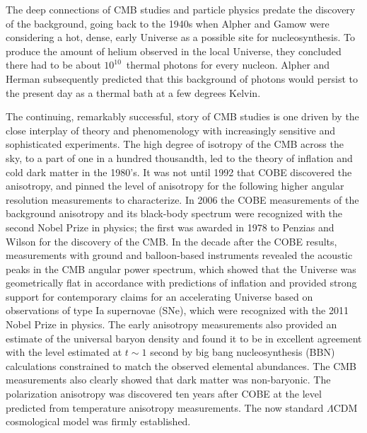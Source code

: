 The deep connections of CMB studies and particle physics predate the discovery of the background, going back to the 1940s when Alpher and Gamow were considering a hot, dense, early Universe as a possible site for nucleosynthesis. To produce the
amount of helium observed in the local Universe, they concluded there
had to be about $10^{10}$\ thermal photons for every nucleon. Alpher and Herman subsequently predicted that this background of photons would persist to the present day as a thermal bath at a few degrees Kelvin.

The continuing, remarkably successful, story of CMB studies is one driven by the close interplay of theory and phenomenology with increasingly sensitive and sophisticated experiments. The high degree of isotropy of the CMB across the sky, to a part of one in a hundred thousandth, led to the theory of inflation and cold dark matter in the 1980's. It was not until 1992 that COBE discovered the anisotropy, and pinned the level of anisotropy for the following higher angular resolution measurements to characterize. In 2006 the COBE measurements of the background anisotropy and its black-body spectrum were recognized with the second Nobel Prize in physics; the first was awarded in 1978 to Penzias and Wilson for the discovery of the CMB.  In the decade after the COBE results, measurements with ground and balloon-based instruments revealed the acoustic peaks in the CMB angular power spectrum, which showed that the Universe was geometrically flat in accordance with predictions of inflation and provided strong support for contemporary claims for an accelerating Universe based on observations of type Ia supernovae (SNe), which were recognized with the 2011 Nobel Prize in physics. The early anisotropy measurements also provided an estimate of the universal baryon density and found it to be in excellent agreement with the level estimated at $t \sim 1$ second by big bang nucleosynthesis (BBN) calculations constrained to match the observed elemental abundances. The CMB measurements also clearly showed that dark matter was non-baryonic. The polarization anisotropy was discovered ten years after COBE at the level predicted from temperature anisotropy measurements. The now standard $\Lambda$CDM cosmological model was firmly established.

